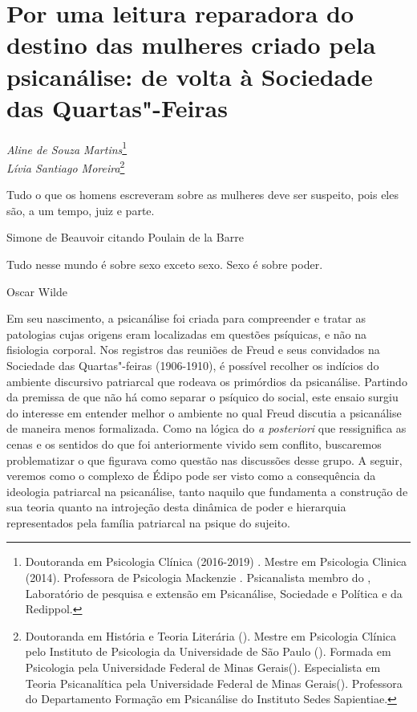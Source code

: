 \chapter*{Por uma leitura reparadora do destino das mulheres criado
pela psicanálise: de volta à Sociedade das Quartas"-Feiras}

\begin{flushright}
\emph{Aline de Souza Martins}\footnote{Doutoranda em Psicologia Clínica (2016-2019) . Mestre em Psicologia Clinica  (2014). Professora de Psicologia Mackenzie
. Psicanalista membro do , Laboratório de pesquisa e extensão em
Psicanálise, Sociedade e Política e da Redippol.} \\ \emph{Lívia Santiago Moreira}\footnote{Doutoranda em História e Teoria Literária
(). Mestre em Psicologia Clínica pelo Instituto de Psicologia da
Universidade de São Paulo (). Formada em Psicologia pela Universidade
Federal de Minas Gerais(). Especialista em Teoria Psicanalítica pela
Universidade Federal de Minas Gerais(). Professora do Departamento
Formação em Psicanálise do Instituto Sedes Sapientiae.}
\end{flushright}

\epigraph{Tudo o que os homens escreveram sobre as mulheres deve ser suspeito,
pois eles são, a um tempo, juiz e parte.}{Simone de Beauvoir citando Poulain de la Barre}

\epigraph{Tudo nesse mundo é sobre sexo exceto sexo. Sexo é sobre poder.}{Oscar Wilde}

Em seu nascimento, a psicanálise foi criada para compreender e tratar as
patologias cujas origens eram localizadas em questões psíquicas, e não
na fisiologia corporal. Nos registros das reuniões de Freud e seus
convidados na Sociedade das Quartas"-feiras (1906-1910), é possível
recolher os indícios do ambiente discursivo patriarcal que rodeava os
primórdios da psicanálise. Partindo da premissa de que não há como
separar o psíquico do social, este ensaio surgiu do interesse em
entender melhor o ambiente no qual Freud discutia a psicanálise de
maneira menos formalizada. Como na lógica do \emph{a posteriori} que
ressignifica as cenas e os sentidos do que foi anteriormente vivido sem
conflito, buscaremos problematizar o que figurava como questão nas
discussões desse grupo. A seguir, veremos como o complexo de Édipo pode
ser visto como a consequência da ideologia patriarcal na psicanálise,
tanto naquilo que fundamenta a construção de sua teoria quanto na
introjeção desta dinâmica de poder e hierarquia representados pela
família patriarcal na psique do sujeito.

